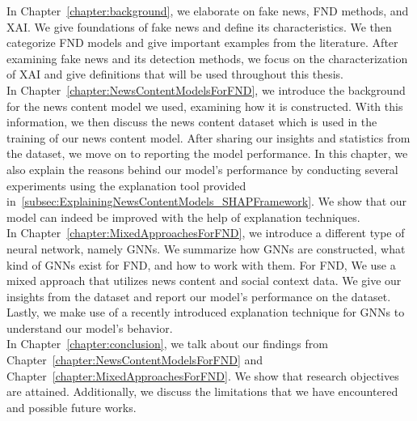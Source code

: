 In Chapter~\ref{chapter:background}, we elaborate on fake news, FND methods, and XAI. We give foundations of fake news
and define its characteristics. We then categorize FND models and give important examples from the literature. After examining fake news and its detection methods, we focus on the characterization of XAI and give definitions that will be
used throughout this thesis.\\
In Chapter~\ref{chapter:NewsContentModelsForFND}, we introduce the background for the news content model we used, examining how it is constructed. With this information, we then discuss the news content dataset which is used in the training of our news content model. After sharing our insights and statistics from the dataset, we move on to reporting the model performance. In this chapter, we also explain the reasons behind our model's performance by conducting several experiments using the explanation tool provided in~\ref{subsec:ExplainingNewsContentModels_SHAPFramework}. We show that our model can indeed be improved with the help of explanation techniques.\\
In Chapter~\ref{chapter:MixedApproachesForFND}, we introduce a different type of neural network, namely GNNs. We summarize how GNNs are constructed, what kind of GNNs exist for FND, and how to work with them. For FND, We use a mixed approach that utilizes news content and social context data. We give our insights from the dataset and report our model's performance on the dataset. Lastly, we make use of a recently introduced explanation technique for GNNs to understand our model's behavior.\\
In Chapter~\ref{chapter:conclusion}, we talk about our findings from Chapter~\ref{chapter:NewsContentModelsForFND} and Chapter~\ref{chapter:MixedApproachesForFND}. We show that research objectives are attained. Additionally, we discuss the limitations that we have encountered and possible future works.\\





